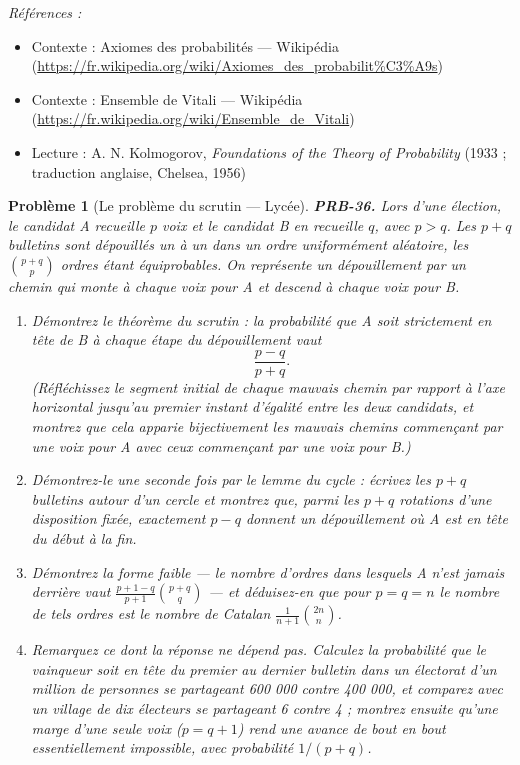 \documentclass[11pt]{article}
\newtheorem{problem}{Problème}
\newenvironment{refs}{\par\small\noindent\emph{Références :}\begin{itemize}\setlength\itemsep{0pt}}{\end{itemize}\normalsize}
\begin{document}
\begin{refs}
\item Contexte : Axiomes des probabilités --- Wikipédia (\url{https://fr.wikipedia.org/wiki/Axiomes_des_probabilit%C3%A9s})
\item Contexte : Ensemble de Vitali --- Wikipédia (\url{https://fr.wikipedia.org/wiki/Ensemble_de_Vitali})
\item Lecture : A. N. Kolmogorov, \textit{Foundations of the Theory of Probability} (1933 ; traduction anglaise, Chelsea, 1956)
\end{refs}

\bigskip

\begin{problem}[{Le problème du scrutin --- Lycée}]
\textbf{PRB-36.} Lors d'une élection, le candidat A recueille $ p $ voix et le candidat B en
recueille $ q $, avec $ p > q $. Les $ p + q $ bulletins sont dépouillés un à un dans un
ordre uniformément aléatoire, les $ \binom{p+q}{p} $ ordres étant équiprobables. On représente un
dépouillement par un chemin qui monte à chaque voix pour A et descend à chaque voix pour B.
\begin{enumerate}
\item[(a)] Démontrez le théorème du scrutin : la probabilité que A soit strictement en tête de B à chaque
étape du dépouillement vaut
\[ \frac{p-q}{p+q} . \]
(Réfléchissez le segment initial de chaque mauvais chemin par rapport à l'axe horizontal jusqu'au
premier instant d'égalité entre les deux candidats, et montrez que cela apparie bijectivement les
mauvais chemins commençant par une voix pour A avec ceux commençant par une voix pour B.)
\item[(b)] Démontrez-le une seconde fois par le lemme du cycle : écrivez les $ p+q $ bulletins autour
d'un cercle et montrez que, parmi les $ p+q $ rotations d'une disposition fixée, exactement
$ p - q $ donnent un dépouillement où A est en tête du début à la fin.
\item[(c)] Démontrez la forme faible --- le nombre d'ordres dans lesquels A n'est jamais \textit{derrière}
vaut $ \frac{p+1-q}{p+1}\binom{p+q}{q} $ --- et déduisez-en que pour $ p = q = n $ le nombre de
tels ordres est le nombre de Catalan $ \frac{1}{n+1}\binom{2n}{n} $.
\item[(d)] Remarquez ce dont la réponse ne dépend pas. Calculez la probabilité que le vainqueur soit en
tête du premier au dernier bulletin dans un électorat d'un million de personnes se partageant
600 000 contre 400 000, et comparez avec un village de dix électeurs se partageant 6 contre
4 ; montrez ensuite qu'une marge d'une seule voix ($ p = q+1 $) rend une avance de bout en bout
essentiellement impossible, avec probabilité $ 1/(p+q) $.
\end{enumerate}

\end{problem}
\end{document}
